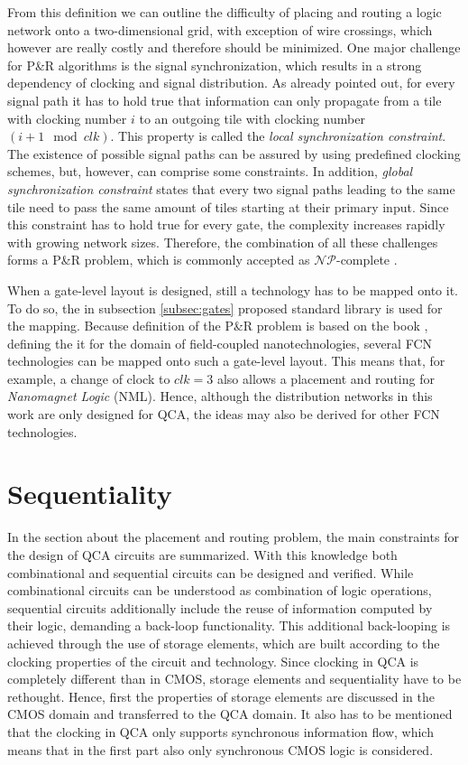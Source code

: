 From this definition we can outline the difficulty of placing and routing a logic network onto a two-dimensional grid, with exception of wire crossings, which however are really costly and therefore should be minimized. One major challenge for P\&R algorithms is the signal synchronization, which results in a strong dependency of clocking and signal distribution. As already pointed out, for every signal path it has to hold true that information can only propagate from a tile with clocking number $i$ to an outgoing tile with clocking number $(i+1 \mod clk)$. This property is called the \textit{local synchronization constraint}. The existence of possible signal paths can be assured by using predefined clocking schemes, but, however, can comprise some constraints. In addition, \textit{global synchronization constraint} states that every two signal paths leading to the same tile need to pass the same amount of tiles starting at their primary input. Since this constraint has to hold true for every gate, the complexity increases rapidly with growing network sizes. Therefore, the combination of all these challenges forms a P\&R problem, which is commonly accepted as $\mathcal{NP}$-complete \cite{NP-hard}.

When a gate-level layout is designed, still a technology has to be mapped onto it. To do so, the in subsection \ref{subsec:gates} proposed standard library is used for the mapping. Because definition of the P\&R problem is based on the book \cite{Walter}, defining the it for the domain of field-coupled nanotechnologies, several FCN technologies can be mapped onto such a gate-level layout. This means that, for example, a change of clock to $clk = 3$ also allows a placement and routing for \textit{Nanomagnet Logic} (NML). Hence, although the distribution networks in this work are only designed for QCA, the ideas may also be derived for other FCN technologies.

\section{Sequentiality}\label{subsec:latchesandregisters}

In the section about the placement and routing problem, the main constraints for the design of QCA circuits are summarized. With this knowledge both combinational and sequential circuits can be designed and verified. While combinational circuits can be understood as combination of logic operations, sequential circuits additionally include the reuse of information computed by their logic, demanding a back-loop functionality. This additional back-looping is achieved through the use of storage elements, which are built according to the clocking properties of the circuit and technology. Since clocking in QCA is completely different than in CMOS, storage elements and sequentiality have to be rethought. Hence, first the properties of storage elements are discussed in the CMOS domain and transferred to the QCA domain. It also has to be mentioned that the clocking in QCA only supports synchronous information flow, which means that in the first part also only synchronous CMOS logic is considered.

